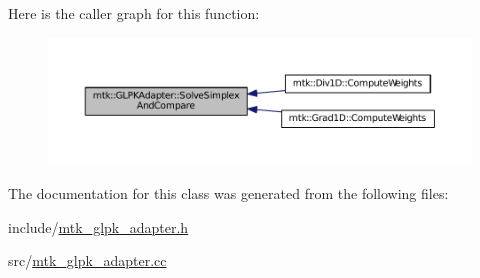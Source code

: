 Here is the caller graph for this function\-:\nopagebreak
\begin{figure}[H]
\begin{center}
\leavevmode
\includegraphics[width=350pt]{classmtk_1_1GLPKAdapter_a834480aca83e3c0d09fdab7fdb7e8a3f_icgraph}
\end{center}
\end{figure}




The documentation for this class was generated from the following files\-:\begin{DoxyCompactItemize}
\item 
include/\hyperlink{mtk__glpk__adapter_8h}{mtk\-\_\-glpk\-\_\-adapter.\-h}\item 
src/\hyperlink{mtk__glpk__adapter_8cc}{mtk\-\_\-glpk\-\_\-adapter.\-cc}\end{DoxyCompactItemize}
